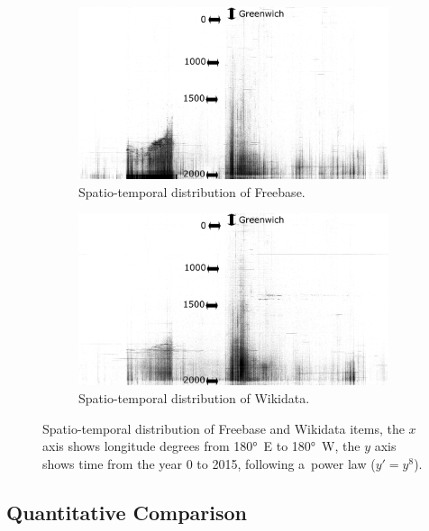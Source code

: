 \documentclass{acm_proc_article-sp}
\begin{document}
\begin{figure}[h]
    \centering
    \begin{subfigure}[b]{1.0\columnwidth}
        \includegraphics[width=\textwidth]{img/freebase-projection-bw.pdf}
        \caption{Spatio-temporal distribution of Freebase.}
        \label{fig:freebase}
    \end{subfigure}
    \begin{subfigure}[b]{1.0\columnwidth}
        \includegraphics[width=\textwidth]{img/wikidata-projection-bw.pdf}
        \caption{Spatio-temporal distribution of Wikidata.}
        \label{fig:wikidata}
    \end{subfigure}
    \caption{Spatio-temporal distribution of Freebase and Wikidata items,
      the $x$ axis shows longitude degrees from 180°~E to 180°~W, the $y$ axis shows time
      from the year 0 to 2015, following a~power law ($y' = y^8$).}
    \label{fig:time-space}
\end{figure}

\subsection{Quantitative Comparison}
\end{document}
